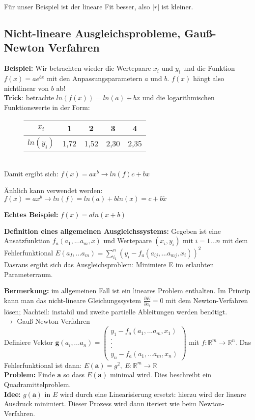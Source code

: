 \documentclass{scrartcl}
\begin{document}
Für unser Beispiel ist der lineare Fit besser, also $|r|$ ist kleiner.

\subsection{Nicht-lineare Ausgleichsprobleme, Gauß-Newton Verfahren}
\textbf{Beispiel:} Wir betrachten wieder die Wertepaare $x_i$ und $y_i$ und die Funktion $f(x)=a e^{bx}$ mit den Anpassungsparametern $a$ und $b$. $f(x)$ hängt also nichtlinear von $b$ ab! \\
\textbf{Trick}: betrachte $ln(f(x))=ln(a)+b x$ und die logarithmischen Funktionswerte in der Form: \begin{figure}[h]
\center

\begin{tabular}{|c||c|c|c|c|}

$x_i$ & 1 & 2 & 3 & 4 \\ 
\hline 
$ln(y_i)$ & 1,72 & 1,52 & 2,30 & 2,35\\ 

\end{tabular}
\end{figure}\\
Damit ergibt sich: $f(x)= a x^b \rightarrow ln(f) c+ b x$

Änhlich kann verwendet werden: $f(x) = a x^b \rightarrow ln(f) = ln(a) + b ln(x) = c + b \tilde{x}$

\textbf{Echtes Beispiel:} $f(x)=a ln(x+b)$

\textbf{Definition eines allgemeinen Ausgleichssystems:} Gegeben ist eine Ansatzfunktion $f_a(a_1,... a_m, x)$ und Wertepaare $(x_i,y_i)$ mit $i=1...n$ mit dem Fehlerfunktional $E(a_I,...a_m) = \sum_{i_1}^n (y_i -f_a(a_{ij},...a_{mj},x_i))^2$\\
Dasraus ergibt sich das Ausgleichsproblem: Minimiere E im erlaubten Parameterraum.

\textbf{Bermerkung:} im allgemeinen Fall ist ein lineares Problem enthalten. Im Prinzip kann man das nicht-lineare Gleichungssystem $\frac{\partial E}{\partial a_i}=0$ mit dem Newton-Verfahren lösen; Nachteil: instabil und zweite partielle Ableitungen werden benötigt.\\
$\rightarrow$ Gauß-Newton-Verfahren \\
Definiere Vektor $\boldsymbol{g}(a_i,... a_n) = \begin{pmatrix}
y_1-f_a(a_1,... a_m, x_1)\\
.\\
.\\
.\\
y_n-f_a(a_1,... a_m, x_n)
\end{pmatrix}$ mit $f: \mathbb{R}^m \rightarrow \mathbb{R}^n$.
Das Fehlerfunktional ist dann: $E(\boldsymbol{a})=g^2, \ E:\mathbb{R}^m \rightarrow \mathbb{R}$\\
\textbf{Problem:} Finde $\boldsymbol{a}$ so dass $E(\boldsymbol{a})$ minimal wird. Dies beschreibt ein Quadramittelproblem. \\
\textbf{Idee:} $g(\boldsymbol{a})$ in $E$ wird durch eine Linearisierung ersetzt:
hierzu wird der lineare Ausdruck minimiert.
Dieser Prozess wird dann iteriert wie beim Newton-Verfahren.
\end{document}

